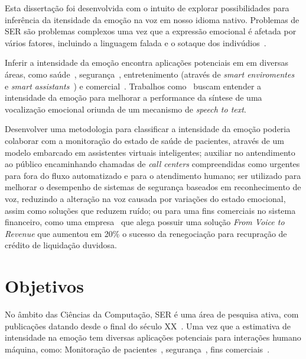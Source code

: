 
Esta dissertação foi desenvolvida com o intuito de explorar possibilidades para inferência da itensidade da emoção na voz em nosso idioma nativo. Problemas de \acrshort{SER} são problemas complexos uma vez que a expressão emocional é afetada por vários fatores, incluindo a linguagem falada e o sotaque dos indivúdios~\cite{6}.

Inferir a intensidade da emoção encontra aplicações potenciais em em diversas áreas, como saúde~\cite{1}, segurança~\cite{4}, entretenimento (através de \textit{smart enviromentes}~\cite{alexa1} e \textit{smart assistants}~\cite{alexa2}) e comercial~\cite{bsignal1, bsignal2}. Trabalhos como~\cite{63} buscam entender a intensidade da emoção para melhorar a performance da síntese de uma vocalização emocional oriunda de um mecanismo de \textit{speech to text}.

Desenvolver uma metodologia para classificar a intensidade da emoção poderia colaborar com a monitoração do estado de saúde de pacientes, através de um modelo embarcado em assistentes virtuais inteligentes; auxiliar no antendimento ao público encaminhando chamadas de \textit{call centers} compreendidas como urgentes para fora do fluxo automatizado e para o atendimento humano; ser utilizado para melhorar o desempenho de sistemas de segurança baseados em reconhecimento de voz, reduzindo a alteração na voz causada por variações do estado emocional, assim como soluções que reduzem ruído; ou para uma fins comerciais no sistema financeiro, como uma empresa~\cite{bsignal0} que alega possuir uma solução \textit{From Voice to Revenue} que aumentou em 20\% o sucesso da renegociação para recupração de crédito de liquidação duvidosa.



\section{Objetivos}

No âmbito das Ciências da Computação, \acrshort{SER} é uma área de pesquisa ativa, com publicações datando desde o final do século XX~\cite{12.27}. Uma vez que a estimativa de intensidade na emoção tem diversas aplicações potenciais para interações humano máquina, como: Monitoração de pacientes~\cite{1}, segurança~\cite{4}, fins comerciais~\cite{bsignal0, bsignal1, bsignal2}.

